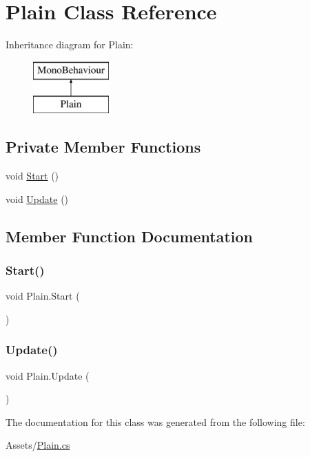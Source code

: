 \hypertarget{class_plain}{}\section{Plain Class Reference}
\label{class_plain}
Inheritance diagram for Plain\+:\begin{figure}[H]
\begin{center}
\leavevmode
\includegraphics[height=2.000000cm]{class_plain}
\end{center}
\end{figure}
\subsection*{Private Member Functions}
\begin{DoxyCompactItemize}
\item 
void \hyperlink{class_plain_ac16b23286105687d19efee2664036817}{Start} ()
\item 
void \hyperlink{class_plain_aa6987996964007fcbaee1c9952d97a48}{Update} ()
\end{DoxyCompactItemize}


\subsection{Member Function Documentation}
\mbox{\label{class_plain_ac16b23286105687d19efee2664036817}} 
\subsubsection{\texorpdfstring{Start()}{Start()}}
{\footnotesize\ttfamily void Plain.\+Start (\begin{DoxyParamCaption}{ }\end{DoxyParamCaption})\hspace{0.3cm}{\ttfamily [private]}}

\mbox{\label{class_plain_aa6987996964007fcbaee1c9952d97a48}} 
\subsubsection{\texorpdfstring{Update()}{Update()}}
{\footnotesize\ttfamily void Plain.\+Update (\begin{DoxyParamCaption}{ }\end{DoxyParamCaption})\hspace{0.3cm}{\ttfamily [private]}}



The documentation for this class was generated from the following file\+:\begin{DoxyCompactItemize}
\item 
Assets/\hyperlink{_plain_8cs}{Plain.\+cs}\end{DoxyCompactItemize}
